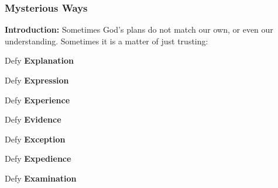 \subsubsection{Mysterious Ways}
\textbf{Introduction:} Sometimes God's plans do not match our own, or even our understanding. Sometimes it is a matter of just trusting:
\begin{compactenum}[I.][8]
    \item Defy \textbf{Explanation} %
    \item Defy \textbf{Expression} %
    \item Defy \textbf{Experience} %
    \item Defy \textbf{Evidence} %
    \item Defy \textbf{Exception} %
    \item Defy \textbf{Expedience} %
    \item Defy \textbf{Examination} %
\end{compactenum}
